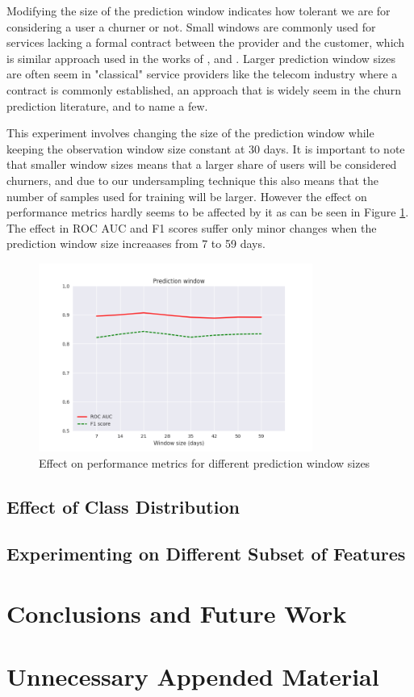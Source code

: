\documentclass{kththesis}
\begin{document}
Modifying the size of the prediction window indicates how tolerant we are for considering a user a churner or not. Small windows are commonly used for services lacking a formal contract between the provider and the customer, which is similar approach used in the works of \citep{Dror2012}, \citep{Runge2014} and \citep{Pudipeddi2014}. Larger prediction window sizes are often seem in "classical" service providers like the telecom industry where a contract is commonly established, an approach that is widely seem in the churn prediction literature, \citep{Khan2015} and \citep{Hassouna2015} to name a few.

This experiment involves changing the size of the prediction window while keeping the observation window size constant at 30 days. It is important to note that smaller window sizes means that a larger share of users will be considered churners, and due to our undersampling technique this also means that the number of samples used for training will be larger. However the effect on performance metrics hardly seems to be affected by it as can be seen in Figure \ref{fig:predwindow}. The effect in ROC AUC and F1 scores suffer only minor changes when the prediction window size increaases from 7 to 59 days.

	\begin{figure}[t]
	\centering
    \includegraphics[width=0.8\textwidth, natwidth=400bp, natheight=200bp]{figures/predwindow_line.png}  
	\caption{Effect on performance metrics for different prediction window sizes}	
    \label{fig:predwindow}
	\end{figure}

\section{Effect of Class Distribution}

\section{Experimenting on Different Subset of Features}


\chapter{Conclusions and Future Work}



\appendix

\chapter{Unnecessary Appended Material}

\todos
\end{document}
